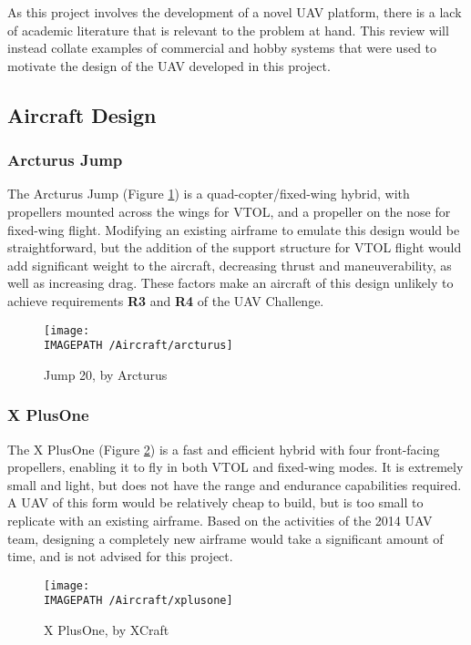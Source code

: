 As this project involves the development of a novel UAV platform, there is a lack of academic literature that is relevant to the problem at hand. This review will instead collate examples of commercial and hobby systems that were used to motivate the design of the UAV developed in this project.\\

\subsection{Aircraft Design}
\label{sec:litaircraft}
\subsubsection*{Arcturus Jump}
The Arcturus Jump \cite{ref:arcturus} (Figure \ref{fig:arcturus}) is a quad-copter/fixed-wing hybrid, with propellers mounted across the wings for VTOL, and a propeller on the nose for fixed-wing flight. Modifying an existing airframe to emulate this design would be straightforward, but the addition of the support structure for VTOL flight would add significant weight to the aircraft, decreasing thrust and maneuverability, as well as increasing drag. These factors make an aircraft of this design unlikely to achieve requirements \textbf{R3} and \textbf{R4} of the UAV Challenge.

\begin{figure}[!h]
	\centering
	\texttt{[image: \\IMAGEPATH /Aircraft/arcturus]}
	\caption{Jump 20, by Arcturus}
	\label{fig:arcturus}
\end{figure}

\subsubsection*{X PlusOne}
The X PlusOne \cite{ref:xplusone} (Figure \ref{fig:xplusone}) is a fast and efficient hybrid with four front-facing propellers, enabling it to fly in both VTOL and fixed-wing modes. It is extremely small and light, but does not have the range and endurance capabilities required. A UAV of this form would be relatively cheap to build, but is too small to replicate with an existing airframe. Based on the activities of the 2014 UAV team, designing a completely new airframe would take a significant amount of time, and is not advised for this project.

\begin{figure}[!ht]
	\centering
	\texttt{[image: \\IMAGEPATH /Aircraft/xplusone]}
	\caption{X PlusOne, by XCraft}
	\label{fig:xplusone}
\end{figure}

